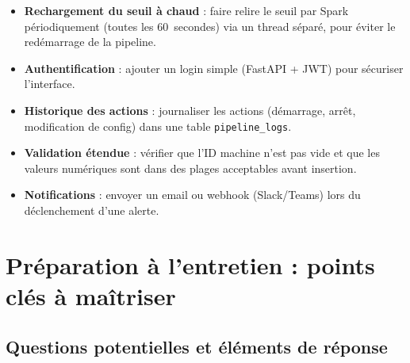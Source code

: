 \documentclass[12pt,a4paper]{article}
\begin{document}
\begin{itemize}
    \item \textbf{Rechargement du seuil à chaud} : faire relire le seuil par Spark périodiquement (toutes les 60~secondes) via un thread séparé, pour éviter le redémarrage de la pipeline.
    \item \textbf{Authentification} : ajouter un login simple (FastAPI + JWT) pour sécuriser l'interface.
    \item \textbf{Historique des actions} : journaliser les actions (démarrage, arrêt, modification de config) dans une table \texttt{pipeline\_logs}.
    \item \textbf{Validation étendue} : vérifier que l'ID machine n'est pas vide et que les valeurs numériques sont dans des plages acceptables avant insertion.
    \item \textbf{Notifications} : envoyer un email ou webhook (Slack/Teams) lors du déclenchement d'une alerte.
\end{itemize}

\newpage

\section{Préparation à l'entretien : points clés à maîtriser}

\subsection{Questions potentielles et éléments de réponse}
\end{document}
